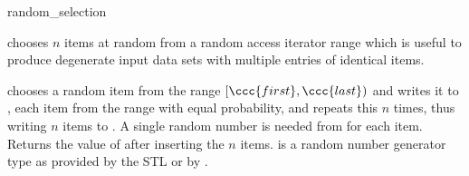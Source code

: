 \begin{ccRefFunction}{random_selection}

\ccDefinition

 chooses $n$ items at random from a random
access iterator range which is useful to produce degenerate input data
sets with multiple entries of identical items.


{ chooses a random item from the range $[\ccc{first},\ccc{last})$ and
    writes it to , each item from the range with equal
    probability, and repeats this $n$ times, thus writing $n$ items to
    .
    A single random number is needed from  for each item.
    Returns the value of  after inserting the $n$ items.
    \ccPrecond {} is a random number generator type as provided 
    by the STL or by .
}

\ccSeeAlso
{} \\

\end{ccRefFunction}

